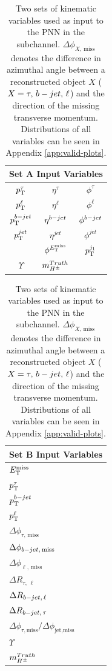       \begin{table}[!thp]
				\begin{subtable}[c]{0.15\textwidth}
					\centering
					\begin{tabular}{| c | c | c |}
		        \multicolumn{3}{c}{\textbf{Set A Input Variables}} \\ \hline \hline
		        $p_{\text{T}}^{\tau}$ & $\eta^{\tau}$ & $\phi^{\tau}$  \\ \hline
		        $p_{\text{T}}^{\ell}$ & $\eta^{\ell}$ & $\phi^{\ell}$  \\ \hline
		        $p_{\text{T}}^{b-jet}$ & $\eta^{b-jet}$ & $\phi^{b-jet}$  \\ \hline
		        $p_{\text{T}}^{jet}$ & $\eta^{jet}$ & $\phi^{jet}$  \\ \hline
		        \Etm & $\phi^{E_\text{T}^\text{miss}}$ & $p_{\text{T}}^{j_{1}}$  \\ \hline
		        $\Upsilon$ & $m_{H^{\pm}}^{Truth}$ &  \\ \hline 
	        \end{tabular}
	      \end{subtable}

				\begin{subtable}[c]{0.25\textwidth}
					\centering
					\begin{tabular}{| l |}
						\hline
						\textbf{Set B Input Variables} \\
						\hline \hline
						$E_\text{T}^\text{miss}$  \\
						$p_{\text{T}}^{\tau}$  \\
						$p_{\text{T}}^{b-jet}$  \\
						$p_{\text{T}}^{\ell}$  \\
						$\Delta \phi_{\tau,\,\text{miss}}$  \\
						$\Delta \phi_{b-jet,\,\text{miss}}$  \\
						$\Delta \phi_{\ell,\,\text{miss}}$  \\
						$\Delta R_{\tau,\,\ell}$ \\
						$\Delta R_{b-jet,\,\ell}$ \\
						$\Delta R_{b-jet,\,\tau}$ \\
						$\Delta \phi_{\tau, \text{miss}} / \Delta \phi_{\text{jet}, \text{miss}}$  \\
						$\Upsilon$ \\
						$m_{H^{\pm}}^{Truth}$ \\ \hline
					\end{tabular}
				\end{subtable}
				\caption{Two sets of kinematic variables used as input to the \gls{PNN} in the \taulep subchannel. $\Delta \phi_{X,\,\text{miss}}$ denotes the difference in azimuthal angle between a reconstructed object $X$ ($X = \tau,\,b-jet,\,\ell$) and the direction of the missing transverse momentum. Distributions of all variables can be seen in Appendix \ref{app:valid-plots}.}
				\label{tab:taulep-input-variables-high-v-low}
			\end{table}

